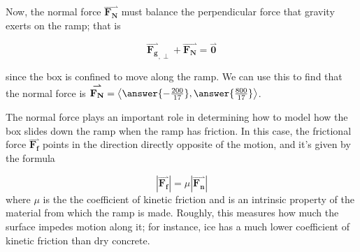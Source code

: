 \documentclass{ximera}
\begin{document}
\begin{example}
\begin{explanation}
\begin{image}
    \end{image}
    
    Now, the normal force $\overset{\boldsymbol{\rightharpoonup}}{\mathbf{F_N}}$ must balance the perpendicular force that gravity exerts on the ramp; that is
    
    \[
     \overset{\boldsymbol{\rightharpoonup}}{\mathbf{F_g}}_{, \perp} + \overset{\boldsymbol{\rightharpoonup}}{\mathbf{F_N}} = \overset{\boldsymbol{\rightharpoonup}}{\mathbf{0}}
    \]
    
    since the box is confined to move along the ramp.  We can use this to find that the normal force is $\overset{\boldsymbol{\rightharpoonup}}{\mathbf{F_N}} = \left< \answer{-\frac{200}{17}},\answer{\frac{800}{17}} \right>$.
    
    \begin{remark}
    The normal force plays an important role in determining how to model how the box slides down the ramp when the ramp has friction.  In this case, the frictional force $\overset{\boldsymbol{\rightharpoonup}}{\mathbf{F_f}}$ points in the direction directly opposite of the motion, and it's given by the formula
    
\[
    |\overset{\boldsymbol{\rightharpoonup}}{\mathbf{F_f}}| =  \mu |\overset{\boldsymbol{\rightharpoonup}}{\mathbf{F_n}}|
\]
where $\mu$ is the the coefficient of kinetic friction and is an intrinsic property of the material from which the ramp is made.  Roughly, this measures how much the surface impedes motion along it; for instance, ice has a much lower coefficient of kinetic friction than dry concrete.       
    \end{remark}
\end{explanation}
\end{example}
\end{document}
